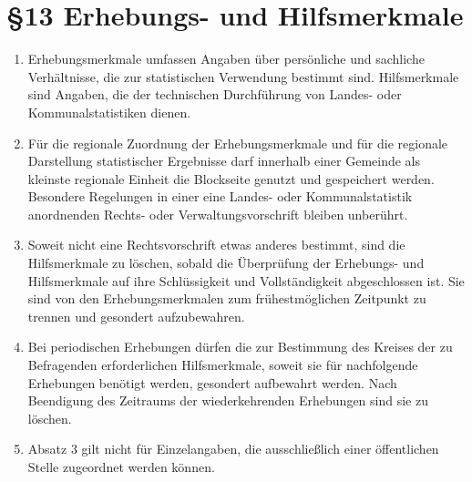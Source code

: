     \section{\S13 Erhebungs- und Hilfsmerkmale}
        \begin{enumerate}[label=(\arabic*)]
            \item Erhebungsmerkmale umfassen Angaben über persönliche und sachliche Verhältnisse, die zur statistischen Verwendung bestimmt sind. Hilfsmerkmale sind Angaben, die der technischen Durchführung von Landes- oder Kommunalstatistiken dienen.
            \item Für die regionale Zuordnung der Erhebungsmerkmale und für die regionale Darstellung statistischer Ergebnisse darf innerhalb einer Gemeinde als kleinste regionale Einheit die Blockseite genutzt und gespeichert werden. Besondere Regelungen in einer eine Landes- oder Kommunalstatistik anordnenden Rechts- oder Verwaltungsvorschrift bleiben unberührt.
            \item Soweit nicht eine Rechtsvorschrift etwas anderes bestimmt, sind die Hilfsmerkmale zu löschen, sobald die Überprüfung der Erhebungs- und Hilfsmerkmale auf ihre Schlüssigkeit und Vollständigkeit abgeschlossen ist. Sie sind von den Erhebungsmerkmalen zum frühestmöglichen Zeitpunkt zu trennen und gesondert aufzubewahren.
            \item Bei periodischen Erhebungen dürfen die zur Bestimmung des Kreises der zu Befragenden erforderlichen Hilfsmerkmale, soweit sie für nachfolgende Erhebungen benötigt werden, gesondert aufbewahrt werden. Nach Beendigung des Zeitraums der wiederkehrenden Erhebungen sind sie zu löschen.
            \item Absatz 3 gilt nicht für Einzelangaben, die ausschließlich einer öffentlichen Stelle zugeordnet werden können.
        \end{enumerate}

